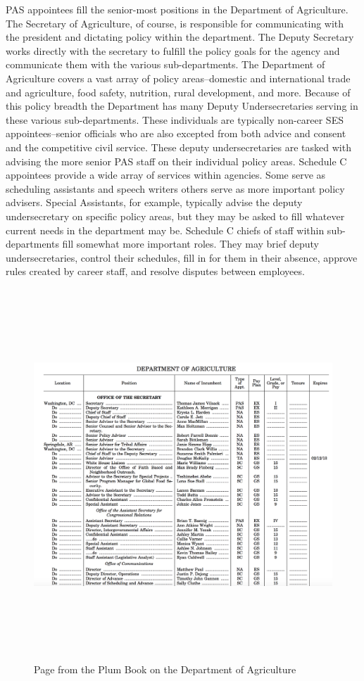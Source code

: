 \documentclass[12pt]{article}
\begin{document}
PAS appointees fill the senior-most positions in the Department of Agriculture. The Secretary of Agriculture, of course, is responsible for communicating with the president and dictating policy within the department. The Deputy Secretary works directly with the secretary to fulfill the policy goals for the agency and communicate them with the various sub-departments. The Department of Agriculture covers a vast array of policy areas--domestic and international trade and agriculture, food safety, nutrition, rural development, and more. Because of this policy breadth the Department has many Deputy Undersecretaries serving in these various sub-departments. These individuals are typically non-career SES appointees--senior officials who are also excepted from both advice and consent and the competitive civil service. These deputy undersecretaries are tasked with advising the more senior PAS staff on their individual policy areas. Schedule C appointees provide a wide array of services within agencies. Some serve as scheduling assistants and speech writers others serve as more important policy advisers. Special Assistants, for example, typically advise the deputy undersecretary on specific policy areas, but they may be asked to fill whatever current needs in the department may be. Schedule C chiefs of staff within sub-departments fill somewhat more important roles. They may brief deputy undersecretaries, control their schedules, fill in for them in their absence, approve rules created by career staff, and resolve disputes between employees. 
	
\begin{figure}[htb]
\begin{center}
\includegraphics[height=5.5in,width=7in]{PlumBookPage.png}
\caption{Page from the Plum Book on the Department of Agriculture}
\end{center}
\end{figure}
\end{document}
